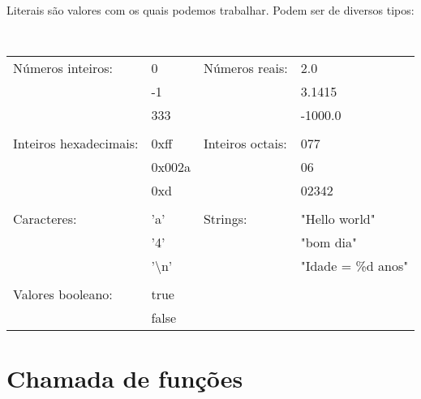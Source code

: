 \documentclass{book}
\begin{document}
Literais são valores com os quais podemos trabalhar. Podem ser de diversos tipos:

\nobreakspace

{\tt
\begin{tabular}{llll}
Números inteiros:        & 0                     & Números reais:    & 2.0       \\
                         & -1                    &                   & 3.1415    \\
                         & 333                   &                   & -1000.0   \\
\\
Inteiros hexadecimais:   & 0xff                  & Inteiros octais:  & 077       \\
                         & 0x002a                &                   & 06        \\
                         & 0xd                   &                   & 02342     \\
\\
Caracteres:              & 'a'                   & Strings:          & "Hello world"       \\
                         & '4'                   &                   & "bom dia"           \\
                         & '\textbackslash n'    &                   & "Idade = \%d anos"   \\
\\
Valores booleano:        & true                  &                   &                      \\
                         & false                 &                   &                      \\
\end{tabular}
}


\section{Chamada de funções}
\end{document}
